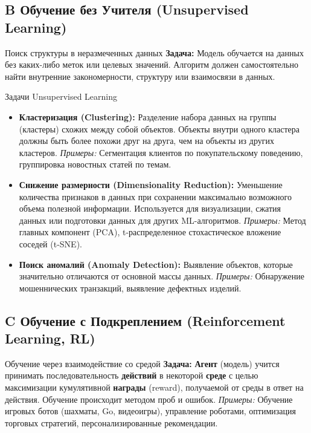 \subsection{B Обучение без Учителя (Unsupervised Learning)}
\begin{myblock}{Поиск структуры в неразмеченных данных}
    \textbf{Задача:} Модель обучается на данных без каких-либо меток или целевых значений. Алгоритм должен самостоятельно найти внутренние закономерности, структуру или взаимосвязи в данных.
\end{myblock}

\begin{myexampleblock}{Задачи Unsupervised Learning}
    \begin{itemize}[nosep, leftmargin=*]
        \item \textbf{Кластеризация (Clustering):} Разделение набора данных на группы (кластеры) схожих между собой объектов. Объекты внутри одного кластера должны быть более похожи друг на друга, чем на объекты из других кластеров.
            \textit{Примеры:} Сегментация клиентов по покупательскому поведению, группировка новостных статей по темам.
        \item \textbf{Снижение размерности (Dimensionality Reduction):} Уменьшение количества признаков в данных при сохранении максимально возможного объема полезной информации. Используется для визуализации, сжатия данных или подготовки данных для других ML-алгоритмов.
            \textit{Примеры:} Метод главных компонент (PCA), t-распределенное стохастическое вложение соседей (t-SNE).
        \item \textbf{Поиск аномалий (Anomaly Detection):} Выявление объектов, которые значительно отличаются от основной массы данных.
            \textit{Примеры:} Обнаружение мошеннических транзакций, выявление дефектных изделий.
    \end{itemize}
\end{myexampleblock}

\subsection{C Обучение с Подкреплением (Reinforcement Learning, RL)}
\begin{myblock}{Обучение через взаимодействие со средой}
    \textbf{Задача:} \textbf{Агент} (модель) учится принимать последовательность \textbf{действий} в некоторой \textbf{среде} с целью максимизации кумулятивной \textbf{награды} (reward), получаемой от среды в ответ на действия. Обучение происходит методом проб и ошибок.
    \textit{Примеры:} Обучение игровых ботов (шахматы, Go, видеоигры), управление роботами, оптимизация торговых стратегий, персонализированные рекомендации.
\end{myblock}

